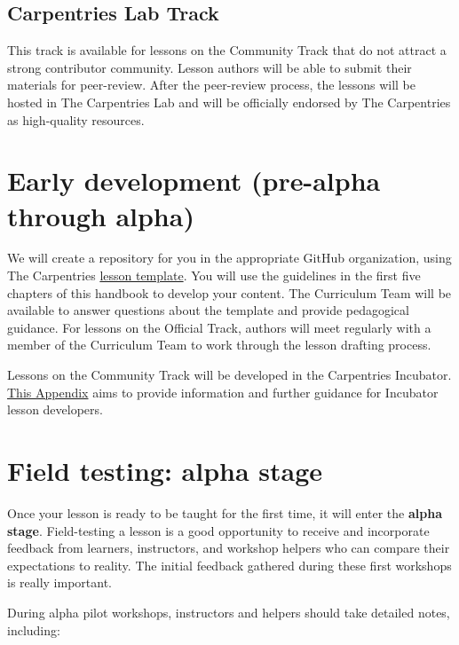 \documentclass[
]{book}
\begin{document}
\hypertarget{carpentries-lab-track}{%
\subsection{Carpentries Lab Track}\label{carpentries-lab-track}}

This track is available for lessons on the Community
Track that do not attract a strong contributor
community. Lesson authors will be able to submit their
materials for peer-review. After the peer-review
process, the lessons will be hosted in The Carpentries
Lab and will be officially endorsed by The Carpentries
as high-quality resources.

\hypertarget{early-development-pre-alpha-through-alpha}{%
\section{Early development (pre-alpha through alpha)}\label{early-development-pre-alpha-through-alpha}}

We will create a repository for you in the appropriate
GitHub organization, using The Carpentries
\href{https://github.com/carpentries/styles}{lesson template}. You will use the
guidelines in the first five chapters of this handbook
to develop your content. The Curriculum Team will
be available to answer questions about the template
and provide pedagogical guidance. For lessons on the
Official Track, authors will meet regularly with
a member of the Curriculum Team to work through the
lesson drafting process.

Lessons on the Community Track will be developed in the Carpentries Incubator.
\href{the-carpentries-incubator.html}{This Appendix} aims to provide
information and further guidance for Incubator lesson developers.

\hypertarget{field-testing-alpha-stage}{%
\section{Field testing: alpha stage}\label{field-testing-alpha-stage}}

Once your lesson is ready to be taught for the first
time, it will enter the \textbf{alpha stage}. Field-testing a
lesson is a good opportunity to receive and incorporate
feedback from learners, instructors, and workshop
helpers who can compare their expectations to
reality. The initial feedback gathered during these first
workshops is really important.

During alpha pilot workshops, instructors and helpers should take detailed notes, including:
\end{document}
